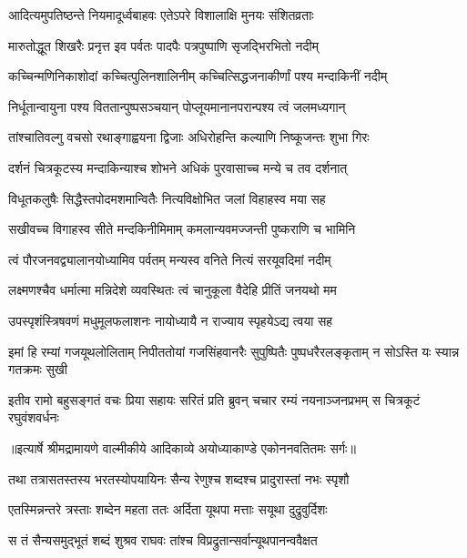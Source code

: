 \twolineshloka
{आदित्यमुपतिष्ठन्ते नियमादूर्ध्वबाहवः}
{एतेऽपरे विशालाक्षि मुनयः संशितव्रताः} %

\twolineshloka
{मारुतोद्धूत शिखरैः प्रनृत्त इव पर्वतः}
{पादपैः पत्रपुष्पाणि सृजद्भिरभितो नदीम्} %

\twolineshloka
{कच्चिन्मणिनिकाशोदां कच्चित्पुलिनशालिनीम्}
{कच्चित्सिद्धजनाकीर्णां पश्य मन्दाकिनीं नदीम्} %

\twolineshloka
{निर्धूतान्वायुना पश्य विततान्पुष्पसञ्चयान्}
{पोप्लूयमानानपरान्पश्य त्वं जलमध्यगान्} %

\twolineshloka
{तांश्चातिवल्गु वचसो रथाङ्गाह्वयना द्विजाः}
{अधिरोहन्ति कल्याणि निष्कूजन्तः शुभा गिरः} %

\twolineshloka
{दर्शनं चित्रकूटस्य मन्दाकिन्याश्च शोभने}
{अधिकं पुरवासाच्च मन्ये च तव दर्शनात्} %

\twolineshloka
{विधूतकलुषैः सिद्धैस्तपोदमशमान्वितैः}
{नित्यविक्षोभित जलां विहाहस्व मया सह} %

\twolineshloka
{सखीवच्च विगाहस्व सीते मन्दकिनीमिमाम्}
{कमलान्यवमज्जन्ती पुष्कराणि च भामिनि} %

\twolineshloka
{त्वं पौरजनवद्व्यालानयोध्यामिव पर्वतम्}
{मन्यस्व वनिते नित्यं सरयूवदिमां नदीम्} %

\twolineshloka
{लक्ष्मणश्चैव धर्मात्मा मन्निदेशे व्यवस्थितः}
{त्वं चानुकूला वैदेहि प्रीतिं जनयथो मम} %

\twolineshloka
{उपस्पृशंस्त्रिषवणं मधुमूलफलाशनः}
{नायोध्यायै न राज्याय स्पृहयेऽद्य त्वया सह} %

\fourlineindentedshloka
{इमां हि रम्यां गजयूथलोलिताम्}
{निपीततोयां गजसिंहवानरैः}
{सुपुष्पितैः पुष्पधरैरलङ्कृताम्}
{न सोऽस्ति यः स्यान्न गतक्रमः सुखी} %

\fourlineindentedshloka
{इतीव रामो बहुसङ्गतं वचः}
{प्रिया सहायः सरितं प्रति ब्रुवन्}
{चचार रम्यं नयनाञ्जनप्रभम्}
{स चित्रकूटं रघुवंशवर्धनः} %


{॥इत्यार्षे श्रीमद्रामायणे वाल्मीकीये आदिकाव्ये अयोध्याकाण्डे एकोननवतितमः सर्गः॥}


\twolineshloka
{तथा तत्रासतस्तस्य भरतस्योपयायिनः}
{सैन्य रेणुश्च शब्दश्च प्रादुरास्तां नभः स्पृशौ} %

\twolineshloka
{एतस्मिन्नन्तरे त्रस्ताः शब्देन महता ततः}
{अर्दिता यूथपा मत्ताः सयूथा दुद्रुवुर्दिशः} %

\twolineshloka
{स तं सैन्यसमुद्भूतं शब्दं शुश्रव राघवः}
{तांश्च विप्रद्रुतान्सर्वान्यूथपानन्ववैक्षत} %

